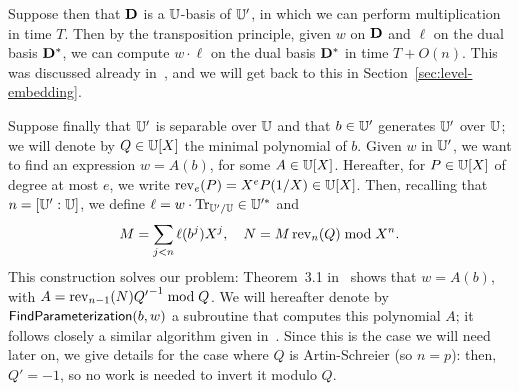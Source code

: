 Suppose then that $\mathbf{D}$ is a $\mathbb{U}$-basis of $\mathbb{U}'$, in which we can
perform multiplication in time $T$. Then by the transposition
principle, given $w$ on $\mathbf{D}$ and $\ell$ on the dual basis
$\mathbf{D}^\ast$, we can compute $w\cdot \ell$ on the dual basis
$\mathbf{D}^\ast$ in time $T+O(n)$.  This was discussed already
in~\cite{Shoup99,BoLeSc03}, and we will get back to this in
Section~\ref{sec:level-embedding}.

Suppose finally that $\mathbb{U}'$ is separable over $\mathbb{U}$ and that $b\in \mathbb{U}'$
generates $\mathbb{U}'$ over $\mathbb{U}$; we will denote by $Q \in \mathbb{U}[X]$ the minimal
polynomial of $b$. Given $w$ in $\mathbb{U}'$, we want to find an expression
$w=A(b)$, for some $A \in \mathbb{U}[X]$. Hereafter, for $P \in \mathbb{U}[X]$ of
degree at most $e$, we write $\operatorname{rev}_e(P)=X^eP(1/X) \in \mathbb{U}[X]$. Then,
recalling that $n=[\mathbb{U}':\mathbb{U}]$, we define $\ell=w\cdot\operatorname{Tr}_{\mathbb{U}'/\mathbb{U}} \in
\mathbb{U}'^\ast$ and
\begin{equation}
  \label{eq:MN}
  M = \sum_{j < n}\ell(b^j)X^j,\quad N = M\operatorname{rev}_{n}(Q) \bmod X^n.
\end{equation}
This construction solves our problem: Theorem~3.1
in~\cite{Rouillier99} shows that $w=A(b)$, with $A=\operatorname{rev}_{n-1}(N)
{Q'}^{-1} \bmod Q$. We will hereafter denote by
${\sf FindParameterization}(b,w)$ a subroutine that computes this
polynomial $A$; it follows closely a similar algorithm given
in~\cite{Sho94}. Since this is the case we will need later on, we give
details for the case where $Q$ is Artin-Schreier (so $n=p$): then,
$Q'=-1$, so no work is needed to invert it modulo $Q$.

